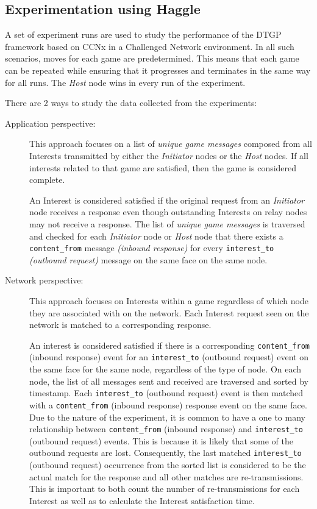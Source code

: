 \documentclass[a4paper,12pt]{report}      %
\begin{document}
\begin{descripton}
\section{Experimentation using Haggle}

A set of experiment runs are used to study the performance of the DTGP framework based on CCNx in a Challenged Network environment.
In all such scenarios, moves for each game are predetermined. This means that each game can be repeated
 while ensuring that it progresses and terminates in the same way for all runs. The \emph{Host} node wins in every run of the experiment. 

\noindent There are 2 ways to study the data collected from the experiments:

\begin{description}
\item[Application perspective:] This approach focuses on a list of \textsl{unique game messages} composed from
all Interests transmitted by either the \emph{Initiator} nodes or the \emph{Host} nodes. If all interests related to that
game are satisfied, then the game is considered complete.

An Interest is considered satisfied if the original request from an \emph{Initiator} node receives a 
response even though outstanding Interests on relay nodes may not receive a response. The list
of \textsl{unique game messages} is traversed and checked for each \emph{Initiator} node or \emph{Host} node that there
exists a \verb!content_from! message \textit{(inbound response)} for every 
\verb!interest_to! \textit{(outbound request)} message on the same face on the same node.

\item[Network perspective:] This approach focuses on Interests within a game regardless of which node they are
 associated with on the network. Each Interest request seen on the network is matched to a
corresponding response.

An interest is considered satisfied if there is a corresponding \verb!content_from! (inbound response) event
for an \verb!interest_to! (outbound request) event on the same face for the same node, regardless of the type
of node. On each node, the list of all messages sent and received are traversed and sorted by timestamp.
Each \verb!interest_to! (outbound request) event is then matched with a \verb!content_from! (inbound response)
response event on the same face. Due to the nature of the experiment, it is common to have a one to
many relationship between \verb!content_from! (inbound response) and \verb!interest_to! (outbound request) events. This is because it is likely that some of the outbound requests are lost. Consequently, the last matched
\verb!interest_to! (outbound request) occurrence from the sorted list is considered to be the actual match for
the response and all other matches are re-transmissions. This is important to both count the number of
re-transmissions for each Interest as well as to calculate the Interest satisfaction time.
\end{description}


\end{descripton}
\end{document}
